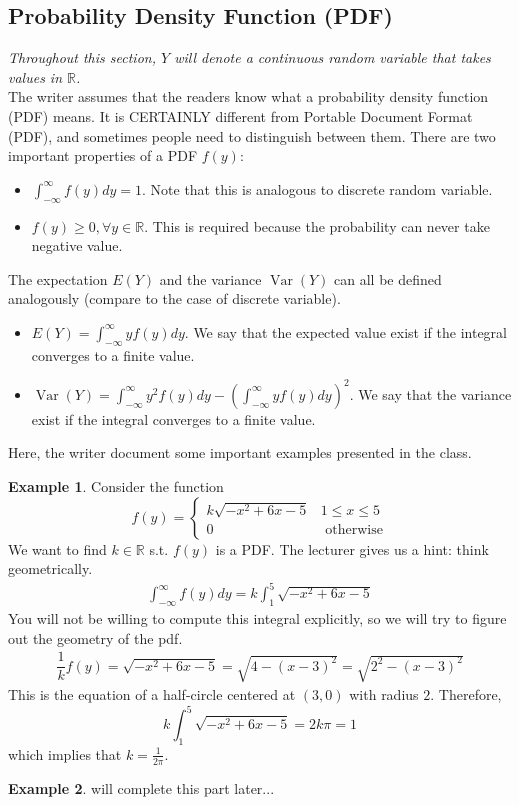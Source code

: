 \documentclass{article}
\theoremstyle{definition}
\theoremstyle{definition}
\theoremstyle{definition}
\theoremstyle{definition}
\theoremstyle{definition}
\theoremstyle{definition}
\newtheorem{example}{Example}
\theoremstyle{definition}
\theoremstyle{definition}
\theoremstyle{definition}
\newcommand{\RR}{\mathbb{R}}
\begin{document}
\subsection{Probability Density Function (PDF)}
\textit{Throughout this section, $Y$ will denote a continuous random variable that takes values in $\RR$.}\\
The writer assumes that the readers know what a probability density function (PDF) means. It is CERTAINLY different from Portable Document Format (PDF), and sometimes people need to distinguish between them.
There are two important properties of a PDF $f(y)$:
\begin{itemize}
    \item $\int_{-\infty}^\infty f(y)dy=1$. Note that this is analogous to discrete random variable.
    \item $f(y)\ge 0,\forall y\in\RR$. This is required because the probability can never take negative value.
\end{itemize}
The expectation $E(Y)$ and the variance $\operatorname{Var}(Y)$ can all be defined analogously (compare to the case of discrete variable).
\begin{itemize}
    \item $E(Y)=\int_{-\infty}^\infty yf(y)dy$. We say that the expected value exist if the integral converges to a finite value.
    \item $\operatorname{Var}(Y)=\int_{-\infty}^\infty y^2f(y)dy-\left(\int_{-\infty}^\infty yf(y)dy\right)^2$. We say that the variance exist if the integral converges to a finite value.
\end{itemize}
Here, the writer document some important examples presented in the class.
\begin{example}
    Consider the function
    \[
    f(y)=\begin{cases}
        k\sqrt{-x^2+6x-5} & 1\le x\le 5\\
        0 &\text{ otherwise}
    \end{cases}    
    \]
    We want to find $k\in\RR$ s.t. $f(y)$ is a PDF. The lecturer gives us a hint: think geometrically.
    \begin{align*}
        \int_{-\infty}^\infty f(y)dy=k\int_1^5\sqrt{-x^2+6x-5}
    \end{align*}
    You will not be willing to compute this integral explicitly, so we will try to figure out the geometry of the pdf.
    \begin{align*}
        \dfrac{1}{k}f(y)=\sqrt{-x^2+6x-5}=\sqrt{4-(x-3)^2}=\sqrt{2^2-(x-3)^2}
    \end{align*}
    This is the equation of a half-circle centered at $(3,0)$ with radius $2$. Therefore,
    \[
        k\int_1^5\sqrt{-x^2+6x-5}=2k\pi=1
    \]
    which implies that $k=\frac{1}{2\pi}$.
\end{example}
\begin{example}
    will complete this part later...
\end{example}
\end{document}
